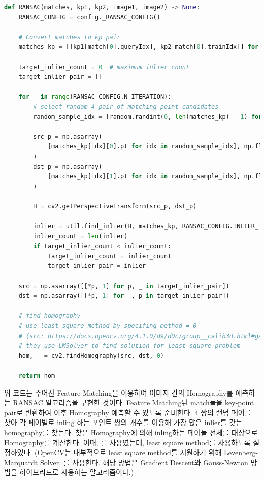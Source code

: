 \documentclass{report}
\begin{document}
\begin{lstlisting}[language=Python, caption=RANSAC, firstnumber=16]
def RANSAC(matches, kp1, kp2, image1, image2) -> None:
    RANSAC_CONFIG = config._RANSAC_CONFIG()

    # Convert matches to kp pair
    matches_kp = [[kp1[match[0].queryIdx], kp2[match[0].trainIdx]] for match in matches]

    target_inlier_count = 0  # maximum inlier count
    target_inlier_pair = []

    for _ in range(RANSAC_CONFIG.N_ITERATION):
        # select random 4 pair of matching point candidates
        random_sample_idx = [random.randint(0, len(matches_kp) - 1) for _ in range(4)]

        src_p = np.asarray(
            [matches_kp[idx][0].pt for idx in random_sample_idx], np.float32
        )
        dst_p = np.asarray(
            [matches_kp[idx][1].pt for idx in random_sample_idx], np.float32
        )

        H = cv2.getPerspectiveTransform(src_p, dst_p)

        inlier = util.find_inlier(H, matches_kp, RANSAC_CONFIG.INLIER_THRESHOLD)
        inlier_count = len(inlier)
        if target_inlier_count < inlier_count:
            target_inlier_count = inlier_count
            target_inlier_pair = inlier

    src = np.asarray([[*p, 1] for p, _ in target_inlier_pair])
    dst = np.asarray([[*p, 1] for _, p in target_inlier_pair])

    # find homography
    # use least square method by specifing method = 0
    # (src: https://docs.opencv.org/4.1.0/d9/d0c/group__calib3d.html#ga4abc2ece9fab9398f2e560d53c8c9780)
    # they use LMSolver to find solution for least square problem
    hom, _ = cv2.findHomography(src, dst, 0)

    return hom
\end{lstlisting}

위 코드는 주어진 Feature Matching을 이용하여 이미지 간의 Homography를 예측하는 RANSAC 알고리즘을 구현한 것이다.
Feature Matching된 match들을 key-point pair로 변환하여 이후 Homography 예측할 수 있도록 준비한다.
4 쌍의 랜덤 페어를 찾아 각 페어별로 inling 하는 포인트 쌍의 개수를 이용해 가장 많은 inlier를 갖는 homography를 찾는다.
찾은 Homography에 의해 inling하는 페어들 전체를 대상으로 Homography를 계산한다.
이때, 를 사용였는데, least square method를 사용하도록 설정하였다.
(OpenCV는 내부적으로 least square method를 지원하기 위해 Levenberg-Marquardt Solver, 를 사용한다.
해당 방법은 Gradient Descent와 Gauss-Newton 방법을 하이브리드로 사용하는 알고리즘이다.)
\end{document}
